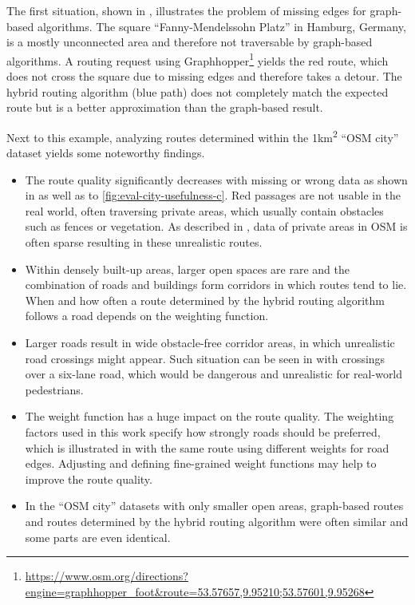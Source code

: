 			The first situation, shown in , illustrates the problem of missing edges for graph-based algorithms.
			The square \enquote{Fanny-Mendelssohn Platz} in Hamburg, Germany, is a mostly unconnected area and therefore not traversable by graph-based algorithms.
			A routing request using Graphhopper\footnote{\url{https://www.osm.org/directions?engine=graphhopper\_foot\&route=53.57657,9.95210;53.57601,9.95268}} yields the red route, which does not cross the square due to missing edges and therefore takes a detour.
			The hybrid routing algorithm (blue path) does not completely match the expected route but is a better approximation than the graph-based result.
			
			Next to this example, analyzing routes determined within the 1km\textsuperscript{2} \enquote{OSM city} dataset yields some noteworthy findings.
			
			\begin{itemize}
				\item The route quality significantly decreases with missing or wrong data as shown in  as well as  to \ref{fig:eval-city-usefulness-c}.
				Red passages are not usable in the real world, often traversing private areas, which usually contain obstacles such as fences or vegetation.
				As described in , data of private areas in OSM is often sparse resulting in these unrealistic routes.
				\item Within densely built-up areas, larger open spaces are rare and the combination of roads and buildings form corridors in which routes tend to lie.
				When and how often a route determined by the hybrid routing algorithm follows a road depends on the weighting function.
				\item Larger roads result in wide obstacle-free corridor areas, in which unrealistic road crossings might appear.
				Such situation can be seen in  with crossings over a six-lane road, which would be dangerous and unrealistic for real-world pedestrians.
				\item The weight function has a huge impact on the route quality.
				The weighting factors used in this work specify how strongly roads should be preferred, which is illustrated in  with the same route using different weights for road edges.
				Adjusting and defining fine-grained weight functions may help to improve the route quality.
				\item In the \enquote{OSM city} datasets with only smaller open areas, graph-based routes and routes determined by the hybrid routing algorithm were often similar and some parts are even identical.
			\end{itemize}
			
